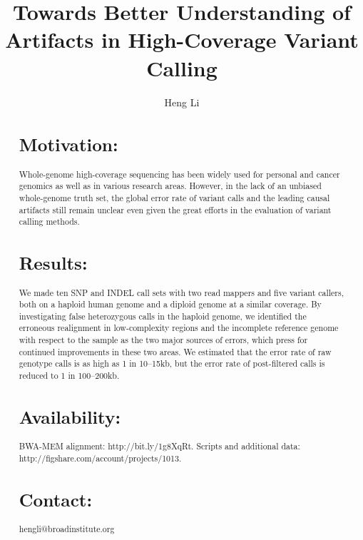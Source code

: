 \documentclass{bioinfo}
\begin{document}

\title{Towards Better Understanding of Artifacts in High-Coverage Variant Calling}
\author[Li]{Heng Li}

\address{Broad Institute of Harvard and MIT, 7 Cambridge Center, Cambridge, MA 02142, USA}

\maketitle

\begin{abstract}

\section{Motivation:} Whole-genome high-coverage sequencing has been widely
used for personal and cancer genomics as well as in various research areas.
However, in the lack of an unbiased whole-genome truth set, the global error
rate of variant calls and the leading causal artifacts still remain unclear
even given the great efforts in the evaluation of variant calling methods.

\section{Results:} We made ten SNP and INDEL call sets with two read mappers
and five variant callers, both on a haploid human genome and a diploid genome
at a similar coverage. By investigating false heterozygous calls in the haploid
genome, we identified the erroneous realignment in low-complexity regions and
the incomplete reference genome with respect to the sample as the two major
sources of errors, which press for continued improvements in these two areas.
We estimated that the error rate of raw genotype calls is as high as 1 in
10--15kb, but the error rate of post-filtered calls is reduced to 1 in
100--200kb.

\section{Availability:} BWA-MEM alignment: http://bit.ly/1g8XqRt. Scripts and
additional data: http://figshare.com/account/projects/1013.

\section{Contact:} hengli@broadinstitute.org

\end{abstract}
\end{document}
